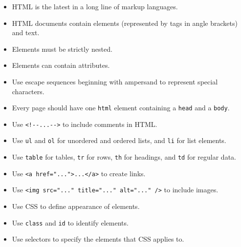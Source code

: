 \begin{itemize}
\item
  HTML is the latest in a long line of markup languages.
\item
  HTML documents contain elements (represented by tags in angle brackets) and text.
\item
  Elements must be strictly nested.
\item
  Elements can contain attributes.
\item
  Use escape sequences beginning with ampersand to represent special characters.
\item
  Every page should have one \texttt{html} element containing a \texttt{head} and a \texttt{body}.
\item
  Use \texttt{\textless{}!-\/-...-\/-\textgreater{}} to include comments in HTML.
\item
  Use \texttt{ul} and \texttt{ol} for unordered and ordered lists, and \texttt{li} for list elements.
\item
  Use \texttt{table} for tables, \texttt{tr} for rows, \texttt{th} for headings, and \texttt{td} for regular data.
\item
  Use \texttt{\textless{}a\ href="..."\textgreater{}...\textless{}/a\textgreater{}} to create links.
\item
  Use \texttt{\textless{}img\ src="..."\ title="..."\ alt="..."\ /\textgreater{}} to include images.
\item
  Use CSS to define appearance of elements.
\item
  Use \texttt{class} and \texttt{id} to identify elements.
\item
  Use selectors to specify the elements that CSS applies to.
\end{itemize}
